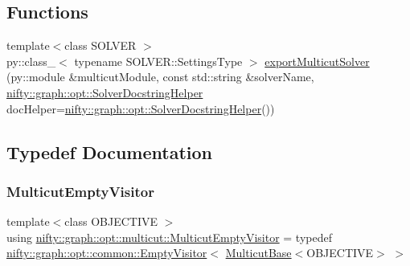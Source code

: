 \subsection*{Functions}
\begin{DoxyCompactItemize}
\item 
{\footnotesize template$<$class S\+O\+L\+V\+ER $>$ }\\py\+::class\+\_\+$<$ typename S\+O\+L\+V\+E\+R\+::\+Settings\+Type $>$ \hyperlink{namespacenifty_1_1graph_1_1opt_1_1multicut_aa76d6b4acd0499b1fb1e18eed88696fb}{export\+Multicut\+Solver} (py\+::module \&multicut\+Module, const std\+::string \&solver\+Name, \hyperlink{classnifty_1_1graph_1_1opt_1_1SolverDocstringHelper}{nifty\+::graph\+::opt\+::\+Solver\+Docstring\+Helper} doc\+Helper=\hyperlink{classnifty_1_1graph_1_1opt_1_1SolverDocstringHelper}{nifty\+::graph\+::opt\+::\+Solver\+Docstring\+Helper}())
\end{DoxyCompactItemize}


\subsection{Typedef Documentation}
\mbox{\label{namespacenifty_1_1graph_1_1opt_1_1multicut_aa5367b6f47794a63333b96b04502396c}} 
\subsubsection{\texorpdfstring{Multicut\+Empty\+Visitor}{MulticutEmptyVisitor}}
{\footnotesize\ttfamily template$<$class O\+B\+J\+E\+C\+T\+I\+VE $>$ \\
using \hyperlink{namespacenifty_1_1graph_1_1opt_1_1multicut_aa5367b6f47794a63333b96b04502396c}{nifty\+::graph\+::opt\+::multicut\+::\+Multicut\+Empty\+Visitor} = typedef \hyperlink{classnifty_1_1graph_1_1opt_1_1common_1_1EmptyVisitor}{nifty\+::graph\+::opt\+::common\+::\+Empty\+Visitor}$<$ \hyperlink{classnifty_1_1graph_1_1opt_1_1multicut_1_1MulticutBase}{Multicut\+Base}$<$O\+B\+J\+E\+C\+T\+I\+VE$>$ $>$}

\mbox{\label{namespacenifty_1_1graph_1_1opt_1_1multicut_af26230604a77c9e38690db74e4fcb7b3}} 
